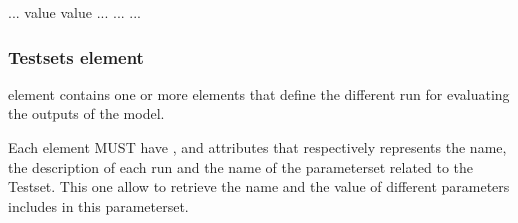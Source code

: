 \documentclass[letterpaper,10pt,english]{sphinxmanual}
\begin{document}
%
\begin{sphinxVerbatim}[commandchars=\\\{\}]
    
    ...
           
          
           value
           value
          ...
       ...
    ...
\end{sphinxVerbatim}


\subsubsection{Testsets element}
\label{\detokenize{user/description:testsets-element}}
\begin{DUlineblock}{0em}
\item[]  element contains one or more  elements that define the different run for evaluating the outputs of the model.
\end{DUlineblock}

\begin{DUlineblock}{0em}
\item[] Each  element MUST have ,  and  attributes that respectively represents the name,
the description of each run and the name of the parameterset related to the Testset. This one allow to retrieve the name and the value of different
parameters includes in this parameterset.
\end{DUlineblock}
\end{document}

